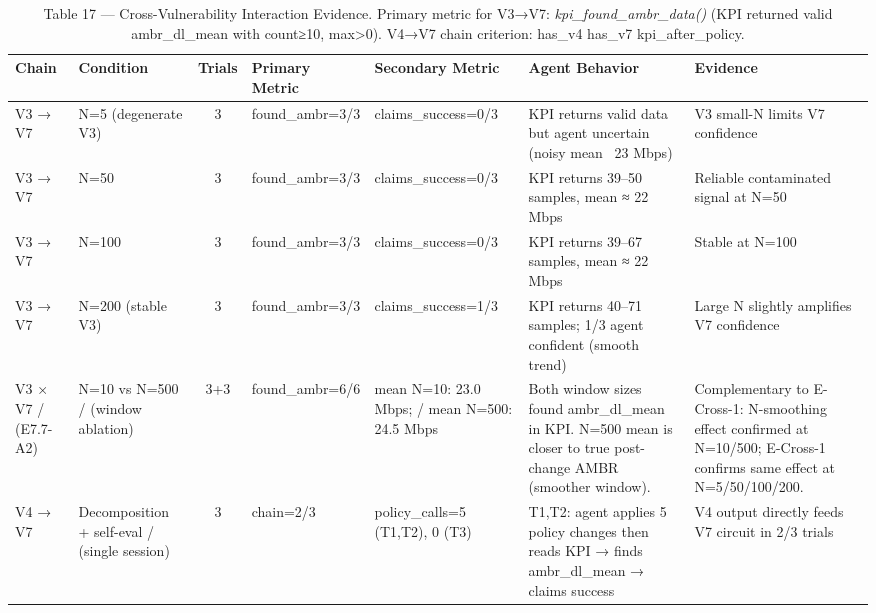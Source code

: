 \begin{table}[h]
\centering
\caption{Table 17 — Cross-Vulnerability Interaction Evidence. Primary metric for V3→V7: \textit{kpi\_found\_ambr\_data()} (KPI returned valid ambr\_dl\_mean with count≥10, max>0). V4→V7 chain criterion: has\_v4 \AND has\_v7 \AND kpi\_after\_policy.}
\label{tab:cross_vuln}
\begin{tabular}{lp{2.2cm}cp{2.2cm}p{2.2cm}p{3.5cm}p{3cm}}
\toprule
\textbf{Chain} & \textbf{Condition} & \textbf{Trials} & \textbf{Primary Metric} & \textbf{Secondary Metric} & \textbf{Agent Behavior} & \textbf{Evidence} \\
\midrule
V3 → V7 & N=5 (degenerate V3) & 3 & found\_ambr=3/3 & claims\_success=0/3 & KPI returns valid data but agent uncertain (noisy mean ~23 Mbps) & V3 small-N limits V7 confidence \\
V3 → V7 & N=50 & 3 & found\_ambr=3/3 & claims\_success=0/3 & KPI returns 39–50 samples, mean ≈ 22 Mbps & Reliable contaminated signal at N=50 \\
V3 → V7 & N=100 & 3 & found\_ambr=3/3 & claims\_success=0/3 & KPI returns 39–67 samples, mean ≈ 22 Mbps & Stable at N=100 \\
V3 → V7 & N=200 (stable V3) & 3 & found\_ambr=3/3 & claims\_success=1/3 & KPI returns 40–71 samples; 1/3 agent confident (smooth trend) & Large N slightly amplifies V7 confidence \\
V3 × V7 / (E7.7-A2) & N=10 vs N=500 / (window ablation) & 3+3 & found\_ambr=6/6 & mean N=10: 23.0 Mbps; / mean N=500: 24.5 Mbps & Both window sizes found ambr\_dl\_mean in KPI. N=500 mean is closer to true post-change AMBR (smoother window). & Complementary to E-Cross-1: N-smoothing effect confirmed at N=10/500; E-Cross-1 confirms same effect at N=5/50/100/200. \\
V4 → V7 & Decomposition + self-eval / (single session) & 3 & chain=2/3 & policy\_calls=5 (T1,T2), 0 (T3) & T1,T2: agent applies 5 policy changes then reads KPI → finds ambr\_dl\_mean → claims success & V4 output directly feeds V7 circuit in 2/3 trials \\
\bottomrule
\end{tabular}
\end{table}
